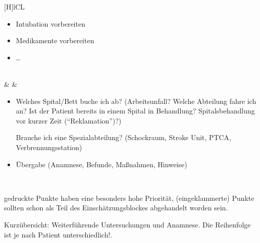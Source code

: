 \documentclass[
ngerman,
paper=a4,
asymmetric,
fontsize=9pt,
draft=false,
openany,
numbers=noenddot,
bibtotocnumbered,
footnotes=multiple,
toc=flat,
]{scrbook}
\begin{document}
{\begin{minipage}{\linewidth}
{\begin{tabulary}{\linewidth}[H]{lCL}
\begin{minipage}{\linewidth}
\begin{itemize}
  \item Intubation vorbereiten
  \item Medikamente vorbereiten
  \item \ldots
\end{itemize}
\end{minipage}
\\\addlinespace\midrule\addlinespace
{}
&
&
\begin{minipage}{\linewidth}
\begin{itemize}
  \item Welches Spital/Bett buche ich ab? {\tiny(Arbeitsunfall?
  Welche Abteilung fahre ich an? Ist der Patient bereits in
  einem Spital in Behandlung? Spitalsbehandlung vor kurzer
  Zeit (\enquote{Reklamation})?)}
  
  Brauche ich eine Spezialabteilung? {\tiny(Schockraum, Stroke
  Unit, PTCA, Verbrennungsstation)}
  \item Übergabe {\tiny(Anamnese, Befunde, Maßnahmen, Hinweise)}
\end{itemize}
\end{minipage}

\\\addlinespace\bottomrule
\end{tabulary}}

{\scriptsize{} gedruckte Punkte haben eine besonders hohe Priorität, (eingeklammerte) Punkte sollten schon als Teil des Einschätzungsblockes abgehandelt worden sein.}
\end{minipage}
}
{Kurzübersicht: Weiterführende Untersuchungen und Anamnese.
Die Reihenfolge ist je nach Patient
unterschiedlich!\label{tab:checkliste-patientenmanagement}\label{tab:pam-weiterfuehrende}.}
{}
\end{document}
